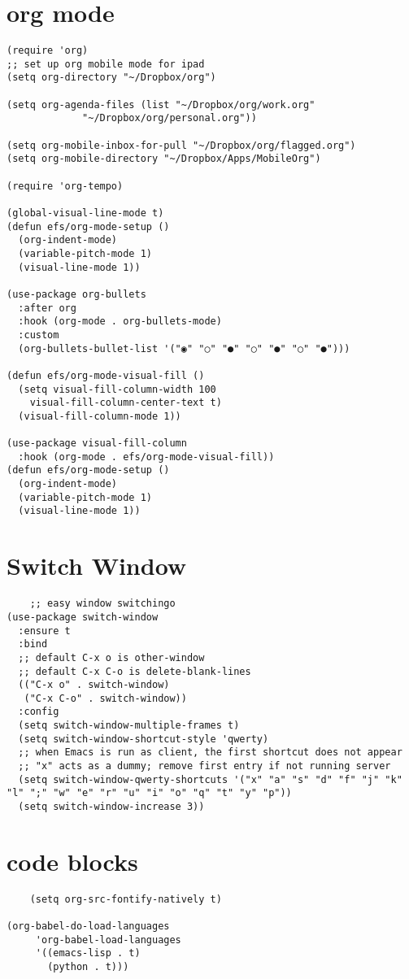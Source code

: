 \documentclass[11pt]{article}
\begin{document}
\section{org mode}
\label{sec:org8431f62}
\begin{verbatim}
(require 'org)
;; set up org mobile mode for ipad
(setq org-directory "~/Dropbox/org")

(setq org-agenda-files (list "~/Dropbox/org/work.org"
			 "~/Dropbox/org/personal.org"))

(setq org-mobile-inbox-for-pull "~/Dropbox/org/flagged.org")
(setq org-mobile-directory "~/Dropbox/Apps/MobileOrg")

(require 'org-tempo)

(global-visual-line-mode t)
(defun efs/org-mode-setup ()
  (org-indent-mode)
  (variable-pitch-mode 1)
  (visual-line-mode 1))

(use-package org-bullets
  :after org
  :hook (org-mode . org-bullets-mode)
  :custom
  (org-bullets-bullet-list '("◉" "○" "●" "○" "●" "○" "●")))

(defun efs/org-mode-visual-fill ()
  (setq visual-fill-column-width 100
	visual-fill-column-center-text t)
  (visual-fill-column-mode 1))

(use-package visual-fill-column
  :hook (org-mode . efs/org-mode-visual-fill))
(defun efs/org-mode-setup ()
  (org-indent-mode)
  (variable-pitch-mode 1)
  (visual-line-mode 1))

\end{verbatim}
\section{Switch Window}
\label{sec:org3b5de4f}
\begin{verbatim}
    ;; easy window switchingo
(use-package switch-window
  :ensure t
  :bind
  ;; default C-x o is other-window
  ;; default C-x C-o is delete-blank-lines
  (("C-x o" . switch-window)
   ("C-x C-o" . switch-window))
  :config
  (setq switch-window-multiple-frames t)
  (setq switch-window-shortcut-style 'qwerty)
  ;; when Emacs is run as client, the first shortcut does not appear
  ;; "x" acts as a dummy; remove first entry if not running server
  (setq switch-window-qwerty-shortcuts '("x" "a" "s" "d" "f" "j" "k" "l" ";" "w" "e" "r" "u" "i" "o" "q" "t" "y" "p"))
  (setq switch-window-increase 3))
\end{verbatim}

\section{code blocks}
\label{sec:org837cc0a}
\begin{verbatim}
    (setq org-src-fontify-natively t)

(org-babel-do-load-languages
	 'org-babel-load-languages
	 '((emacs-lisp . t)
	   (python . t)))
\end{verbatim}
\end{document}
